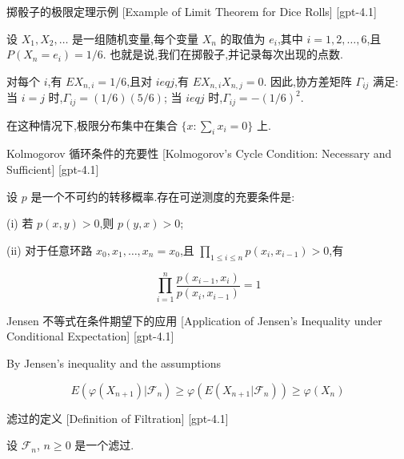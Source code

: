 \documentclass[UTF8]{ctexart}
\begin{document}
    \begin{xmp}
        {掷骰子的极限定理示例}
        [Example of Limit Theorem for Dice Rolls]
        [gpt-4.1]
        
设 $X_1, X_2, \dots$ 是一组随机变量,每个变量 $X_n$ 的取值为 $e_i$,其中 $i = 1, 2, \ldots, 6$,且 $P(X_n = e_i) = 1/6$.
也就是说,我们在掷骰子,并记录每次出现的点数.

对每个 $i$,有 $E X_{n,i} = 1/6$,且对 $i 
eq j$,有 $E X_{n,i} X_{n,j} = 0$.
因此,协方差矩阵 $\Gamma_{ij}$ 满足:
当 $i = j$ 时,$\Gamma_{ij} = (1/6)(5/6)$;
当 $i 
eq j$ 时,$\Gamma_{ij} = - (1/6)^2$.

在这种情况下,极限分布集中在集合 $\{ x : \sum_i x_i = 0 \}$ 上.

    \end{xmp}
    
    
    
    \begin{thm}
        {Kolmogorov 循环条件的充要性}
        [Kolmogorov's Cycle Condition: Necessary and Sufficient]
        [gpt-4.1]
        
设 $p$ 是一个不可约的转移概率.存在可逆测度的充要条件是:

(i) 若 $p(x, y) > 0$,则 $p(y, x) > 0$;

(ii) 对于任意环路 $x_0, x_1, \ldots, x_n = x_0$,且 $\prod_{1 \leq i \leq n} p(x_i, x_{i-1}) > 0$,有

\[
\prod_{i=1}^{n} \frac{p(x_{i-1}, x_i)}{p(x_i, x_{i-1})} = 1
\]

    \end{thm}
    
    
    
    \begin{prf}
        {Jensen 不等式在条件期望下的应用}
        [Application of Jensen's Inequality under Conditional Expectation]
        [gpt-4.1]
        
By Jensen's inequality and the assumptions

\[
E ( \varphi ( X_{n+1} ) | \mathcal{F}_n ) \geq \varphi ( E ( X_{n+1} | \mathcal{F}_n ) ) \geq \varphi ( X_n )
\]

    \end{prf}
    
    
    
    \begin{dfn}
        {滤过的定义}
        [Definition of Filtration]
        [gpt-4.1]
        
设 $\mathcal{F}_n$, $n \geq 0$ 是一个滤过.

    \end{dfn}
    
\end{document}

